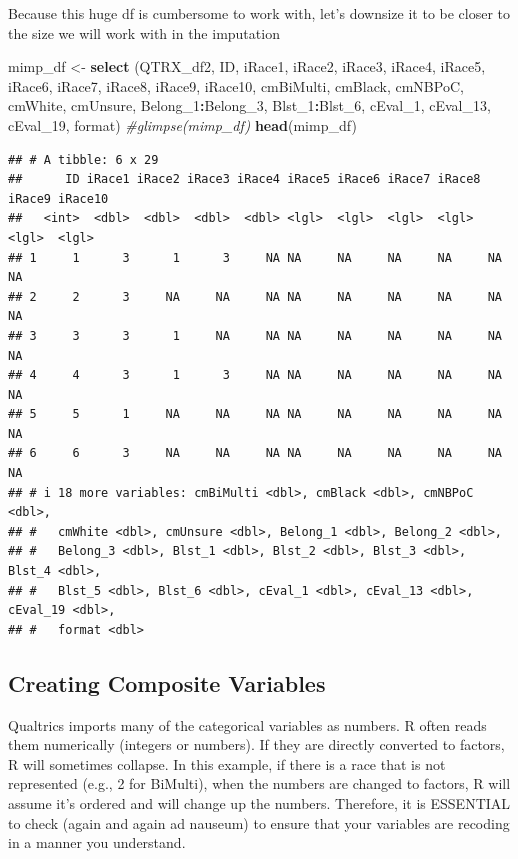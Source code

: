 \documentclass[
  11pt,
]{book}
\newenvironment{Shaded}{\begin{snugshade}}{\end{snugshade}}
\newcommand{\CommentTok}[1]{\textcolor[rgb]{0.37,0.37,0.37}{\textit{#1}}}
\newcommand{\FunctionTok}[1]{\textcolor[rgb]{0.27,0.27,0.27}{\textbf{#1}}}
\newcommand{\NormalTok}[1]{#1}
\newcommand{\OtherTok}[1]{\textcolor[rgb]{0.37,0.37,0.37}{#1}}
\newcommand{\SpecialCharTok}[1]{\textcolor[rgb]{0.43,0.43,0.43}{\textbf{#1}}}
\begin{document}
Because this huge df is cumbersome to work with, let's downsize it to be closer to the size we will work with in the imputation

\begin{Shaded}
\begin{Highlighting}[]
\NormalTok{mimp\_df }\OtherTok{\textless{}{-}}  \FunctionTok{select}\NormalTok{ (QTRX\_df2, ID, iRace1, iRace2, iRace3, iRace4, iRace5, iRace6, iRace7, iRace8, iRace9, iRace10, cmBiMulti, cmBlack, cmNBPoC, cmWhite, cmUnsure, Belong\_1}\SpecialCharTok{:}\NormalTok{Belong\_3, Blst\_1}\SpecialCharTok{:}\NormalTok{Blst\_6, cEval\_1, cEval\_13, cEval\_19, format)}
\CommentTok{\#glimpse(mimp\_df)}
\FunctionTok{head}\NormalTok{(mimp\_df)}
\end{Highlighting}
\end{Shaded}

\begin{verbatim}
## # A tibble: 6 x 29
##      ID iRace1 iRace2 iRace3 iRace4 iRace5 iRace6 iRace7 iRace8 iRace9 iRace10
##   <int>  <dbl>  <dbl>  <dbl>  <dbl> <lgl>  <lgl>  <lgl>  <lgl>  <lgl>  <lgl>  
## 1     1      3      1      3     NA NA     NA     NA     NA     NA     NA     
## 2     2      3     NA     NA     NA NA     NA     NA     NA     NA     NA     
## 3     3      3      1     NA     NA NA     NA     NA     NA     NA     NA     
## 4     4      3      1      3     NA NA     NA     NA     NA     NA     NA     
## 5     5      1     NA     NA     NA NA     NA     NA     NA     NA     NA     
## 6     6      3     NA     NA     NA NA     NA     NA     NA     NA     NA     
## # i 18 more variables: cmBiMulti <dbl>, cmBlack <dbl>, cmNBPoC <dbl>,
## #   cmWhite <dbl>, cmUnsure <dbl>, Belong_1 <dbl>, Belong_2 <dbl>,
## #   Belong_3 <dbl>, Blst_1 <dbl>, Blst_2 <dbl>, Blst_3 <dbl>, Blst_4 <dbl>,
## #   Blst_5 <dbl>, Blst_6 <dbl>, cEval_1 <dbl>, cEval_13 <dbl>, cEval_19 <dbl>,
## #   format <dbl>
\end{verbatim}

\hypertarget{creating-composite-variables}{%
\subsection{Creating Composite Variables}\label{creating-composite-variables}}

Qualtrics imports many of the categorical variables as numbers. R often reads them numerically (integers or numbers). If they are directly converted to factors, R will sometimes collapse. In this example, if there is a race that is not represented (e.g., 2 for BiMulti), when the numbers are changed to factors, R will assume it's ordered and will change up the numbers. Therefore, it is ESSENTIAL to check (again and again ad nauseum) to ensure that your variables are recoding in a manner you understand.
\end{document}
